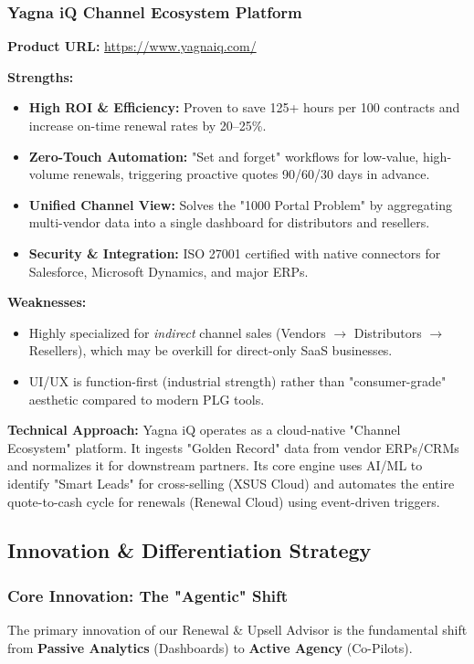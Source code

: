 \documentclass[12pt,a4paper]{article}
\begin{document}
\subsubsection{Yagna iQ Channel Ecosystem Platform}
\textbf{Product URL:} \url{https://www.yagnaiq.com/}

\textbf{Strengths:}
\begin{itemize}
    \item \textbf{High ROI \& Efficiency:} Proven to save 125+ hours per 100 contracts and increase on-time renewal rates by 20--25\%.
    \item \textbf{Zero-Touch Automation:} "Set and forget" workflows for low-value, high-volume renewals, triggering proactive quotes 90/60/30 days in advance.
    \item \textbf{Unified Channel View:} Solves the "1000 Portal Problem" by aggregating multi-vendor data into a single dashboard for distributors and resellers.
    \item \textbf{Security \& Integration:} ISO 27001 certified with native connectors for Salesforce, Microsoft Dynamics, and major ERPs.
\end{itemize}

\textbf{Weaknesses:}
\begin{itemize}
    \item Highly specialized for \textit{indirect} channel sales (Vendors $\rightarrow$ Distributors $\rightarrow$ Resellers), which may be overkill for direct-only SaaS businesses.
    \item UI/UX is function-first (industrial strength) rather than "consumer-grade" aesthetic compared to modern PLG tools.
\end{itemize}

\textbf{Technical Approach:} Yagna iQ operates as a cloud-native "Channel Ecosystem" platform. It ingests "Golden Record" data from vendor ERPs/CRMs and normalizes it for downstream partners. Its core engine uses AI/ML to identify "Smart Leads" for cross-selling (XSUS Cloud) and automates the entire quote-to-cash cycle for renewals (Renewal Cloud) using event-driven triggers.


\subsection{Innovation \& Differentiation Strategy}
\subsubsection{Core Innovation: The "Agentic" Shift}
The primary innovation of our Renewal \& Upsell Advisor is the fundamental shift from \textbf{Passive Analytics} (Dashboards) to \textbf{Active Agency} (Co-Pilots).
\end{document}
